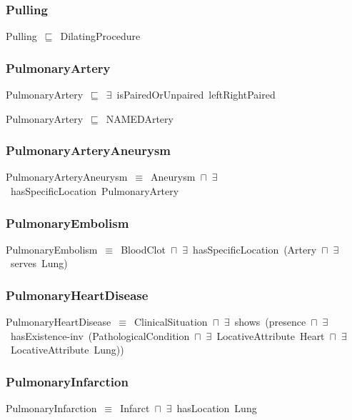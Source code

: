 \documentclass{article}
\begin{document}
\subsubsection*{Pulling}

Pulling~\ensuremath{\sqsubseteq}~DilatingProcedure~

\subsubsection*{PulmonaryArtery}

PulmonaryArtery~\ensuremath{\sqsubseteq}~\ensuremath{\exists}~isPairedOrUnpaired~leftRightPaired~

PulmonaryArtery~\ensuremath{\sqsubseteq}~NAMEDArtery~

\subsubsection*{PulmonaryArteryAneurysm}

PulmonaryArteryAneurysm~\ensuremath{\equiv}~Aneurysm~\ensuremath{\sqcap}~\ensuremath{\exists}~hasSpecificLocation~PulmonaryArtery

\subsubsection*{PulmonaryEmbolism}

PulmonaryEmbolism~\ensuremath{\equiv}~BloodClot~\ensuremath{\sqcap}~\ensuremath{\exists}~hasSpecificLocation~(Artery~\ensuremath{\sqcap}~\ensuremath{\exists}~serves~Lung)

\subsubsection*{PulmonaryHeartDisease}

PulmonaryHeartDisease~\ensuremath{\equiv}~ClinicalSituation~\ensuremath{\sqcap}~\ensuremath{\exists}~shows~(presence~\ensuremath{\sqcap}~\ensuremath{\exists}~hasExistence-inv~(PathologicalCondition~\ensuremath{\sqcap}~\ensuremath{\exists}~LocativeAttribute~Heart~\ensuremath{\sqcap}~\ensuremath{\exists}~LocativeAttribute~Lung))

\subsubsection*{PulmonaryInfarction}

PulmonaryInfarction~\ensuremath{\equiv}~Infarct~\ensuremath{\sqcap}~\ensuremath{\exists}~hasLocation~Lung
\end{document}
